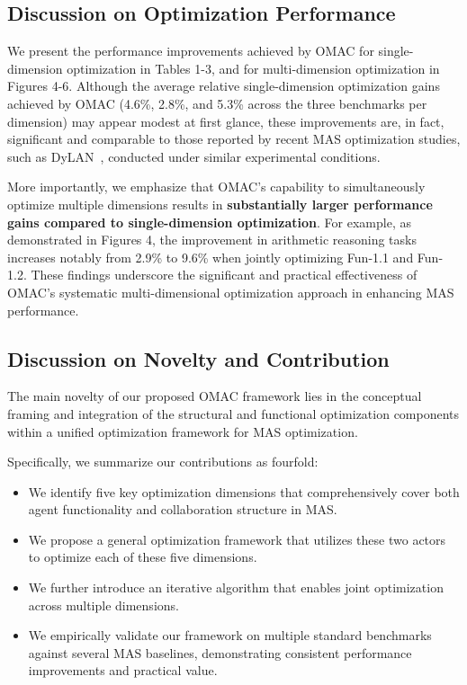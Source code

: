 \subsection{Discussion on Optimization Performance}



We present the performance improvements achieved by OMAC for single-dimension optimization in Tables 1-3, and for multi-dimension optimization in Figures 4-6. Although the average relative single-dimension optimization gains achieved by OMAC (4.6\%, 2.8\%, and 5.3\% across the three benchmarks per dimension) may appear modest at first glance, these improvements are, in fact, significant and comparable to those reported by recent MAS optimization studies, such as DyLAN~\cite{dylan}, conducted under similar experimental conditions.

More importantly, we emphasize that OMAC's capability to simultaneously optimize multiple dimensions results in \textbf{substantially larger performance gains compared to single-dimension optimization}. For example, as demonstrated in Figures 4, the improvement in arithmetic reasoning tasks increases notably from 2.9\% to 9.6\% when jointly optimizing Fun-1.1 and Fun-1.2. These findings underscore the significant and practical effectiveness of OMAC's systematic multi-dimensional optimization approach in enhancing MAS performance.


\subsection{Discussion on Novelty and Contribution}



The main novelty of our proposed OMAC framework lies in the conceptual framing and integration of the structural and functional optimization components within a unified optimization framework for MAS optimization. 

Specifically, we summarize our contributions as fourfold:

\begin{itemize}

\item  We identify five key optimization dimensions that comprehensively cover both agent functionality and collaboration structure in MAS.

\item  We propose a general optimization framework that utilizes these two actors to optimize each of these five dimensions.

\item  We further introduce an iterative algorithm that enables joint optimization across multiple dimensions.

\item  We empirically validate our framework on multiple standard benchmarks against several MAS baselines, demonstrating consistent performance improvements and practical value.

\end{itemize}

